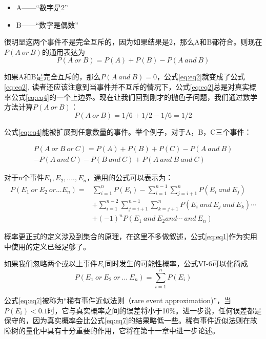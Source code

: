 \documentclass[cn,11pt,chinese]{elegantbook}
\begin{document}
\begin{itemize}
	\item A——“数字是2”
	\item  B——“数字是偶数”
\end{itemize}

很明显这两个事件不是完全互斥的，因为如果结果是2，那么A和B都符合。则现在$P(A\ or\ B)$的通用表达为
\begin{equation}
P(A\ or \ B)=P(A)+P(B)-P(A \ and \ B) 
\label{eq:eq4}
\end{equation}

如果A和B是完全互斥的，那么$P(A \ and \ B)=0$，公式\ref{eq:eq2}就变成了公式\ref{eq:eq2}, 读者还应该注意到当事件并不互斥的情况下，公式\ref{eq:eq2}总是对真实概率公式\ref{eq:eq4}的一个上边界。现在让我们回到刚才的抛色子问题，我们通过数学方法计算$P(A\ or\ B)$：
$$P(A \ or \ B)=1/6+1/2-1/6=1/2$$

公式\ref{eq:eq4}能被扩展到任意数量的事件。举个例子，对于A，B，C三个事件：

\begin{align}
P(A \ or \ B \ or \ C)=P(A)+P(B)+P(C)-P(A \ and \ B)  \nonumber \\ - P(A \ and \ C) - P(B \ and \ C)+P(A \ and \ B \ and \ C) 
\label{eq:eq5}
\end{align}


对于n个事件$E_1,E_2,....,E_n$，通用的公式可以表示为：
\begin{align}
P(E_1 \ or \ E_2 \ or ...E_n)  = & \sum_{i=1}^{n}P(E_i)-\sum_{i=1}^{n-1}\sum_{j=i+1}^{n}P(E_i \ and \ E_j)  \nonumber \\ 
& + \sum_{i=1}^{n-2}\sum_{j=i+1}^{n-1}\sum_{k=j+1}^{n}P(E_i \ and \ E_j \ and \ E_k)\cdots  \nonumber \\
& + (-1)^n P(E_1 \ and \ E_2 and \cdots  \ and \ E_n)
 \label{eq:eq6}
\end{align}

概率更正式的定义涉及到集合的原理，在这里不多做叙述，公式\ref{eq:eq1}作为实用中使用的定义已经足够了。

如果我们忽略两个或以上事件$E_i$同时发生的可能性概率，公式VI-6可以化简成
\begin{equation}
P(E_1 \ or \ E_2 \ or \ ... \ E_n) = \sum_{i=1}^{n}P(E_i) 
\label{eq:eq7}
\end{equation}


公式\ref{eq:eq7}被称为“稀有事件近似法则（rare event approximation)”，当$P(E_i)<0.1$时，它与真实概率之间的误差将小于10\%。进一步说，任何误差都是保守的，因为真实概率会比公式\ref{eq:eq7}的结果略低一些。稀有事件近似法则在故障树的量化中具有十分重要的作用，它将在第十一章中进一步论述。
\end{document}
